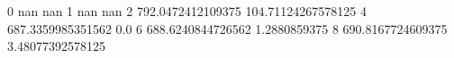 0 nan nan
1 nan nan
2 792.0472412109375 104.71124267578125
4 687.3359985351562 0.0
6 688.6240844726562 1.2880859375
8 690.8167724609375 3.48077392578125
